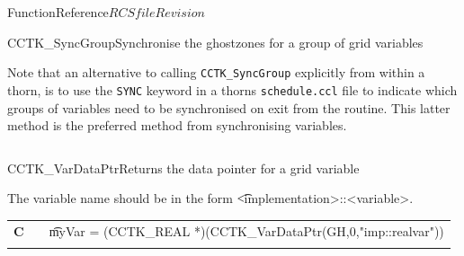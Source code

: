 \begin{cactuspart}{FunctionReference}{$RCSfile$}{$Revision$}
\begin{CCTKFunc}{CCTK\_SyncGroup}{Synchronise the ghostzones for a group of grid variables}
\begin{discussion}
Note that an alternative to calling {\tt CCTK\_SyncGroup} explicitly
from within a thorn, is to use the {\tt SYNC} keyword in a thorns
{\tt schedule.ccl} file to indicate which groups of variables need
to be synchronised on exit from the routine. This latter method is
the preferred method from synchronising variables.
\end{discussion}
\begin{examples}
\begin{tabular}{@{}p{3cm}cp{11cm}}
\end{tabular}
\end{examples}
\begin{errorcodes}
\end{errorcodes}
\end{CCTKFunc}






\begin{CCTKFunc}{CCTK\_VarDataPtr}{Returns the data pointer for a grid variable}
\label{CCTK-VarDataPtr}
\showcargs
\begin{params}
\end{params}
\begin{discussion}
The variable name should be in the form {\t <implementation>::<variable>}.
\end{discussion}
\begin{examples}
\begin{tabular}{@{}p{3cm}cp{11cm}}
\hfill {\bf C} && {\t myVar = (CCTK\_REAL *)(CCTK\_VarDataPtr(GH,0,"imp::realvar"))}\\
\\
\end{tabular}
\end{examples}
\begin{errorcodes}
\end{errorcodes}
\end{CCTKFunc}


\end{cactuspart}
